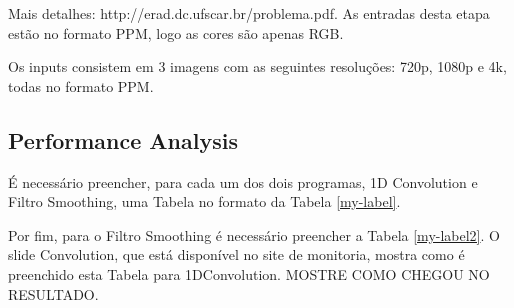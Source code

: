 \documentclass[12pt,a4paper,notitlepage]{report}
\begin{document}
Mais detalhes: http://erad.dc.ufscar.br/problema.pdf. As entradas desta etapa estão no formato PPM, logo as cores são apenas RGB.

Os inputs consistem em 3 imagens com as seguintes resoluções: 720p, 1080p e 4k, todas no formato PPM.\\

\subsection*{Performance Analysis}
É necessário preencher, para cada um dos dois programas, 1D Convolution e Filtro Smoothing, uma Tabela no formato da Tabela \ref{my-label}.
\begin{table}[]
\centering
\caption{Speedup Filter Smoothing and 1D Convolution}
\label{my-label}
\end{table}

Por fim, para o Filtro Smoothing é necessário preencher a Tabela \ref{my-label2}. O slide Convolution, que está disponível no site de monitoria, mostra como é preenchido esta Tabela para 1DConvolution. MOSTRE COMO CHEGOU NO RESULTADO.

\begin{table}[]
\centering
\caption{Only for Filter Smoothing}
\label{my-label2}
\end{table}
\end{document}
